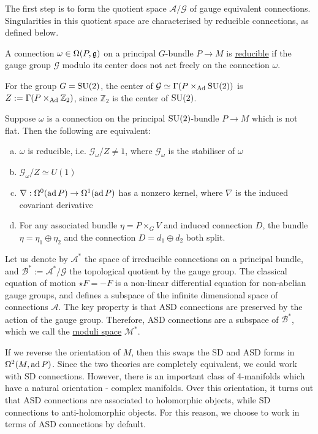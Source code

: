 The first step is to form the quotient space $\mathcal{A} /\mathcal{G}$ of gauge 
equivalent connections.  
Singularities in this quotient space are characterised by reducible connections,
as defined below.
\begin{defn} %
	A connection $\omega\in \Omega(P,\operatorname{\mathfrak{g}})$ on a principal $G$-bundle  $P\to M$ 
	is \underline{reducible} if the gauge group $\mathcal{G}$ modulo its center 
	does not act freely on the connection $\omega$.
\end{defn}
\noindent
For the group $G=\operatorname{SU}(2)$, the center of 
$\mathcal{G}\simeq \Gamma(P\times_{\operatorname{Ad}} \operatorname{SU}(2))$ is $Z:=\Gamma(P\times_{\operatorname{Ad}}
\mathbb{Z}_2)$, since $\mathbb{Z}_2$ is the center of $\operatorname{SU}(2)$. 

\begin{thm} %
	Suppose $\omega$ is a connection on the principal $\operatorname{SU}(2)$-bundle  $P\to M$ 
	which is not flat. Then the following are equivalent:
	\begin{enumerate}[(a)]
		\item  $\omega$ is reducible, i.e.  $\mathcal{G}_\omega / Z \neq 1$, 
			where $\mathcal{G}_\omega$ is the stabiliser of $\omega$
	    \item $\mathcal{G}_{\omega} / Z \simeq U(1)$ 	
		\item $\nabla : \Omega^0(\operatorname{ad} P) \to \Omega^1(\operatorname{ad} P)$ has a nonzero
			kernel, where  $\nabla$ is the induced covariant derivative
		\item For any associated bundle $\eta = P\times_G V$ and induced 
			connection $D$,  the bundle $\eta = \eta_1 \oplus \eta_2$ and the
			connection $D= d_1\oplus d_2$ both split.
	\end{enumerate}
\end{thm}

Let us denote by $\mathcal{A}^*$ the space of irreducible connections on a
principal bundle, and $\mathcal{B}^* := \mathcal{A^*} / \mathcal{G}$ the
topological quotient by the gauge group.  
The classical equation of motion $\star F = - F$ is a non-linear differential 
equation for non-abelian gauge groups, and defines a subspace of the infinite
dimensional space of connections $\mathcal{A}$.
The key property is that ASD connections are preserved by the
action of the gauge group. 
Therefore, ASD connections are a subspace of 
$\mathcal{B}^*$, which we call the \underline{moduli space} $\mathcal{M}^*$.
\begin{remark}
If we reverse the orientation of $M$, then this swaps the SD and ASD forms in
$\Omega^2(M,\operatorname{ad} P)$. Since the two theories are completely
equivalent, we could work with SD connections. However, there is an
important class of 4-manifolds which have a natural orientation - complex
manifolds. Over this orientation, it turns out that ASD connections are 
associated to holomorphic objects, while SD connections to anti-holomorphic
objects.\cite[p.95]{morgan} For this reason, we choose to work in terms of 
ASD connections by default.
\end{remark}


